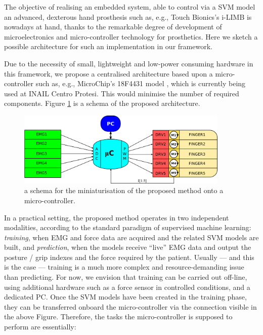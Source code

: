 The objective of realising an embedded system, able to control via a
SVM model an advanced, dexterous hand prosthesis such as, e.g., Touch
Bionics's i-LIMB is nowadays at hand, thanks to the remarkable degree
of development of microelectronics and micro-controller technology for
prosthetics. Here we sketch a possible architecture for such an
implementation in our framework.

Due to the necessity of small, lightweight and low-power consuming
hardware in this framework, we propose a centralised architecture
based upon a micro-controller such as, e.g., MicroChip's 18F4431 model
\cite{mc}, which is currently being used at INAIL Centro Protesi.
This would minimise the number of required components. Figure
\ref{fig:mc} is a schema of the proposed architecture.

\begin{figure}[!ht] \centering
  \includegraphics[width=0.9\textwidth]{figs/mc}
  \caption{a schema for the miniaturisation of the proposed method
    onto a micro-controller.}
  \label{fig:mc}
\end{figure}

In a practical setting, the proposed method operates in two
independent modalities, according to the standard paradigm of
supervised machine learning: \emph{training}, when EMG and force data
are acquired and the related SVM models are built, and
\emph{prediction}, when the models receive ``live'' EMG data and
output the posture / grip indexes and the force required by the
patient. Usually --- and this is the case --- training is a much more
complex and resource-demanding issue than predicting. For now, we
envision that training can be carried out off-line, using additional
hardware such as a force sensor in controlled conditions, and a
dedicated PC. Once the SVM models have been created in the training
phase, they can be transferred onboard the micro-controller via the
connection visible in the above Figure. Therefore, the tasks the
micro-controller is supposed to perform are essentially:

